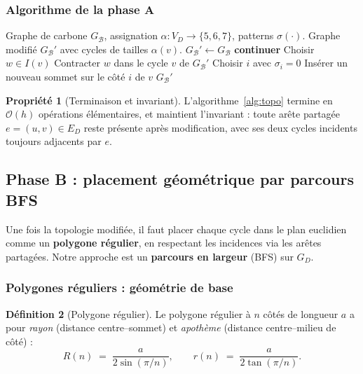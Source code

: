 \documentclass[12pt,a4paper]{article}
\theoremstyle{definition}
\newtheorem{definition}{D\'efinition}[section]
\newtheorem{propriete}[definition]{Propri\'et\'e}
\theoremstyle{remark}
\newcommand{\B}{\mathcal{B}}
\newcommand{\GD}{G_{\!D}}
\newcommand{\GB}{G_{\!\B}}
\newcommand{\VD}{V_{\!D}}
\newcommand{\ED}{E_{\!D}}
\newcommand{\bigO}{\mathcal{O}}
\begin{document}
\subsubsection{Algorithme de la phase A}

\begin{algorithm}[!ht]
\caption{Phase A : modifications topologiques par cycle.}
\label{alg:topo}
\begin{algorithmic}[1]
\Require Graphe de carbone $\GB$, assignation $\alpha : \VD \to \{5,6,7\}$,
patterns $\sigma(\cdot)$.
\Ensure Graphe modifi\'e $\GB'$ avec cycles de tailles $\alpha(v)$.
\State $\GB' \gets \GB$ 
\For{$v \in \VD$}
    \State \textbf{continuer} 
    \State Choisir $w \in I(v)$
    \State Contracter $w$ dans le cycle $v$ de $\GB'$
    \State Choisir $i$ avec $\sigma_i = 0$
    \State Ins\'erer un nouveau sommet sur le c\^ot\'e $i$ de $v$
  \EndIf
\EndFor
\State \Return $\GB'$
\end{algorithmic}
\end{algorithm}

\begin{propriete}[Terminaison et invariant]
L'algorithme~\ref{alg:topo} termine en $\bigO(h)$ op\'erations
\'el\'ementaires, et maintient l'invariant : toute ar\^ete partag\'ee
$e = (u, v) \in \ED$ reste pr\'esente apr\`es modification, avec ses
deux cycles incidents toujours adjacents par $e$.
\end{propriete}

\subsection{Phase B : placement g\'eom\'etrique par parcours BFS}

Une fois la topologie modifi\'ee, il faut placer chaque cycle dans le
plan euclidien comme un \textbf{polygone r\'egulier}, en respectant les
incidences via les ar\^etes partag\'ees. Notre approche est un
\textbf{parcours en largeur} (BFS) sur $\GD$.

\subsubsection{Polygones r\'eguliers : g\'eom\'etrie de base}

\begin{definition}[Polygone r\'egulier]
Le polygone r\'egulier \`a $n$ c\^ot\'es de longueur $a$ a pour
\emph{rayon} (distance centre--sommet) et \emph{apoth\`eme} (distance
centre--milieu de c\^ot\'e) :
\[
  R(n) \;=\; \frac{a}{2 \sin(\pi/n)},
  \qquad
  r(n) \;=\; \frac{a}{2 \tan(\pi/n)}.
\]
\end{definition}
\end{document}
